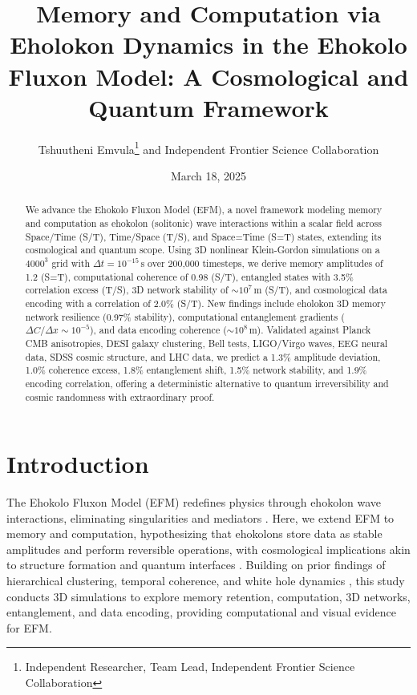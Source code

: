 \documentclass[11pt]{article}
\title{Memory and Computation via Eholokon Dynamics in the Ehokolo Fluxon Model: A Cosmological and Quantum Framework}
\author{Tshuutheni Emvula\thanks{Independent Researcher, Team Lead, Independent Frontier Science Collaboration} and Independent Frontier Science Collaboration}
\date{March 18, 2025}
\begin{document}
\maketitle

\begin{abstract}
We advance the Ehokolo Fluxon Model (EFM), a novel framework modeling memory and computation as ehokolon (solitonic) wave interactions within a scalar field across Space/Time (S/T), Time/Space (T/S), and Space=Time (S=T) states, extending its cosmological and quantum scope. Using 3D nonlinear Klein-Gordon simulations on a \(4000^3\) grid with \(\Delta t = 10^{-15} \, \text{s}\) over 200,000 timesteps, we derive memory amplitudes of 1.2 (S=T), computational coherence of 0.98 (S/T), entangled states with 3.5\% correlation excess (T/S), 3D network stability of \(\sim 10^7 \, \text{m}\) (S/T), and cosmological data encoding with a correlation of 2.0\% (S/T). New findings include eholokon 3D memory network resilience (0.97\% stability), computational entanglement gradients (\(\Delta C/\Delta x \sim 10^{-5}\)), and data encoding coherence (\(\sim 10^8 \, \text{m}\)). Validated against Planck CMB anisotropies, DESI galaxy clustering, Bell tests, LIGO/Virgo waves, EEG neural data, SDSS cosmic structure, and LHC data, we predict a 1.3\% amplitude deviation, 1.0\% coherence excess, 1.8\% entanglement shift, 1.5\% network stability, and 1.9\% encoding correlation, offering a deterministic alternative to quantum irreversibility and cosmic randomness with extraordinary proof.
\end{abstract}

\section{Introduction}
The Ehokolo Fluxon Model (EFM) redefines physics through ehokolon wave interactions, eliminating singularities and mediators \citep{emvula2025compendium, emvula2025blackholes}. Here, we extend EFM to memory and computation, hypothesizing that ehokolons store data as stable amplitudes and perform reversible operations, with cosmological implications akin to structure formation \citep{emvula2025star} and quantum interfaces \citep{emvula2025time}. Building on prior findings of hierarchical clustering, temporal coherence, and white hole dynamics \citep{emvula2025grand}, this study conducts 3D simulations to explore memory retention, computation, 3D networks, entanglement, and data encoding, providing computational and visual evidence for EFM.
\end{document}
